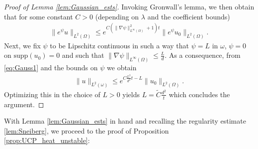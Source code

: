 \documentclass[12pt,twoside]{amsart}
\numberwithin{equation}{section}
\renewcommand{\leq}{\leqslant}
\newcommand{\supp}{\mathrm{supp}}
\begin{document}
\begin{proof}[Proof of Lemma \ref{lem:Gaussian_ests}]
Invoking Gronwall's lemma, we then obtain that for some constant $C>0$ (depending on $\lambda$ and the coefficient bounds)
\begin{align}
\label{eq:Gauss1}
\|e^{\psi} u\|_{L^2(\Omega)} \leq e^{C (\|\nabla \psi\|_{L^{\infty}(\Omega)}^2 +1)t} \|e^{\psi} u_0\|_{L^2(\Omega)}.
\end{align}
Next, we fix $\psi$ to be Lipschitz continuous in such a way that $\psi = L $ in $\omega $, $\psi = 0$ on $\supp(u_0)=0$ and such that $\|\nabla \psi\|_{L^{\infty}(\Omega)} \leq \frac{L}{d}$. As a consequence, from \eqref{eq:Gauss1} and the bounds on $\psi$ we obtain
\begin{align}
\label{eq:Gauss2}
\| u\|_{L^2(\omega)} \leq e^{C \frac{L^2}{d^2} t - L} \| u_0\|_{L^2(\Omega)}.
\end{align}
Optimizing this in the choice of $L>0$ yields $L = \tilde{C} \frac{d^2}{t}$ which concludes the argument.
\end{proof}

With Lemma \ref{lem:Gaussian_ests} in hand and recalling the regularity estimate \eqref{lem:Sneiberg}, we proceed to the proof of Proposition \ref{prop:UCP_heat_unstable}:
\end{document}
